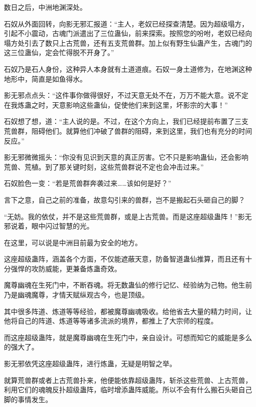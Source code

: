
\begin{this_body}



数日之后，中洲地渊深处。

石奴从外面回转，向影无邪汇报道：“主人，老奴已经探查清楚。因为超级塌方，引起不小震动，古魂门派遣出了三位蛊仙，前来探索。按照您的吩咐，老奴已经向塌方处引去了数只上古荒兽，还有五支荒兽群。加上似有野生仙蛊产生，古魂门的这三位蛊仙，定会忙得脱不开身了。”

石奴乃是石人身份，这种异人本身就有土道道痕。石奴一身土道修为，在地渊这种地形中，简直是如鱼得水。

影无邪点点头：“这件事你做得很好，不过天意无处不在，万万不能大意。说不定在我炼蛊之时，天意影响这些蛊仙，促使他们来到这里，坏影宗的大事！”

石奴想了想，道：“主人说的是。不过，在这个方向上，我们已经提前布置了三支荒兽群，阻碍他们。就算他们冲破了兽群的阻碍，来到这里，我们也有充分的时间反应。”

影无邪微微摇头：“你没有见识到天意的真正厉害。它不只是影响蛊仙，还会影响荒兽、荒植。到了那关键时刻，这些荒兽群说不定也会冲击过来。”

石奴脸色一变：“若是荒兽群奔袭过来……该如何是好？”

言下之意，自己之前的准备，故意勾引来的兽群，岂不是搬起石头砸自己的脚？

“无妨。我的依仗，并不是这些荒兽群，或是上古荒兽。而是这座超级蛊阵！”影无邪说着，眼中闪过智慧的光。

在这里，可以说是中洲目前最为安全的地方。

这座超级蛊阵，涵盖各个方面，不仅能遮蔽天意，防备智道蛊仙推算，而且还有十分强悍的攻防威能，更兼备炼蛊奇效。

魔尊幽魂在生死门中，不断吞魂。将无数蛊仙的修行记忆、经验纳为己物。他生前乃是幽魂魔尊，才情天赋纵观古今，也是顶级。

其中很多阵道、炼道等等经验，都被魔尊幽魂吸收。给他省去大量的精力时间，让他将自己的阵道、炼道等等诸多流派的境界，都推上了大宗师的程度。

而这座超级蛊阵，就是魔尊幽魂在生死门中，亲自设计。可想而知它的威能是多么的强大了。

影无邪依凭这座超级蛊阵，进行炼蛊，无疑是明智之举。

就算荒兽群或者上古荒兽扑来，他便能依靠超级蛊阵，斩杀这些荒兽、上古荒兽，利用它们的魂魄反扑超级蛊阵，临时增添蛊阵威能。所以不会有什么搬石头砸自己脚的事情发生。


\end{this_body}
